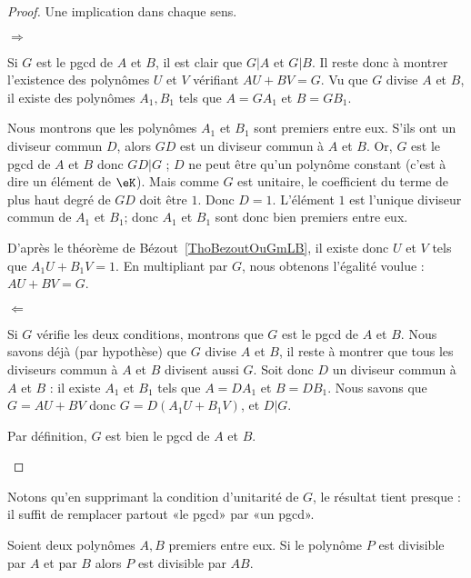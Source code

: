 \begin{proof}
    Une implication dans chaque sens.

    \begin{subproof}
        \item[\( \Rightarrow\)]

        Si $G$ est le pgcd de $A$ et $B$, il est clair que $G|A$ et $G|B$.  Il reste donc à montrer l'existence des polynômes $U$ et $V$ vérifiant $AU+BV=G$. Vu que \( G\) divise \( A\) et \( B\), il existe des polynômes $A_1,B_1$ tels que $A=GA_1$ et $B=GB_1$.

        Nous montrons que les polynômes $A_1$ et $B_1$ sont premiers entre eux. S'ils ont un diviseur commun $D$, alors $GD$ est un diviseur commun à $A$ et $B$.  Or, $G$ est le pgcd de $A$ et $B$ donc $GD|G$ ; $D$ ne peut être qu'un polynôme constant (c'est à dire un élément de \( \eK\)). Mais comme \( G\) est unitaire, le coefficient du terme de plus haut degré de \( GD\) doit être \( 1\). Donc \( D=1\).  L'élément \( 1\) est l'unique diviseur commun de \( A_1\) et \( B_1\); donc $A_1$ et $B_1$ sont donc bien premiers entre eux.

        D'après le théorème de Bézout~\ref{ThoBezoutOuGmLB}, il existe donc $U$ et $V$ tels que $A_1U+B_1V=1$. En multipliant par $G$, nous obtenons l'égalité voulue : $AU+BV=G$.

        \item[\( \Leftarrow\)]

        Si $G$ vérifie les deux conditions, montrons que $G$ est le pgcd de $A$ et $B$. Nous savons déjà (par hypothèse) que $G$ divise $A$ et $B$, il reste à montrer que tous les diviseurs commun à $A$ et $B$ divisent aussi $G$. Soit donc $D$ un diviseur commun à $A$ et $B$ : il existe $A_1$ et $B_1$ tels que $A=DA_1$ et $B=DB_1$. Nous savons que $G=AU+BV$ donc $G=D(A_1U+B_1V)$, et $D|G$.

        Par définition, $G$ est bien le pgcd de $A$ et $B$.
        \end{subproof}
\end{proof}
Notons qu'en supprimant la condition d'unitarité de \( G\), le résultat tient presque : il suffit de remplacer partout «le pgcd» par «un pgcd».

\begin{lemma}       \label{LEMooGNAMooXRpgBn}
Soient deux polynômes $A,B$ premiers entre eux. Si le polynôme \( P\) est divisible par $A$ et par $B$ alors $P$ est divisible par $AB$.
\end{lemma}

